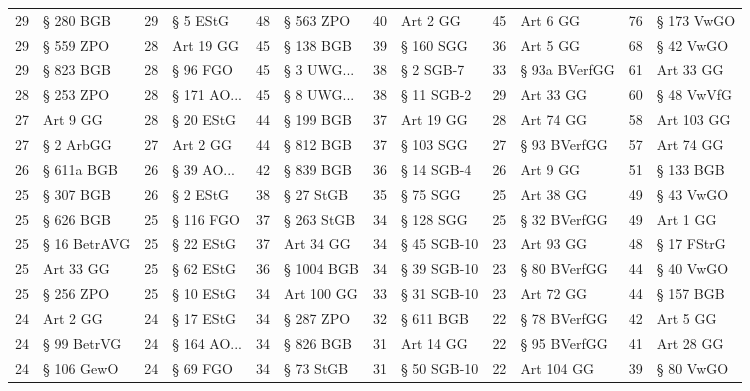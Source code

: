 \begin{tabular}{rlrlrlrlrlrl}
 29 &    § 280 BGB &  29 &       § 5 EStG &  48 &     § 563 ZPO &  40 &    Art 2 GG &     45 &        Art 6 GG &     76 & § 173 VwGO \\
 29 &    § 559 ZPO &  28 &      Art 19 GG &  45 &     § 138 BGB &  39 &   § 160 SGG &     36 &        Art 5 GG &     68 &  § 42 VwGO \\
 29 &    § 823 BGB &  28 &       § 96 FGO &  45 &  § 3 UWG... &  38 &   § 2 SGB-7 &     33 &   § 93a BVerfGG &     61 &  Art 33 GG \\
 28 &    § 253 ZPO &  28 &  § 171 AO... &  45 &  § 8 UWG... &  38 &  § 11 SGB-2 &     29 &       Art 33 GG &     60 & § 48 VwVfG \\
 27 &     Art 9 GG &  28 &      § 20 EStG &  44 &     § 199 BGB &  37 &   Art 19 GG &     28 &       Art 74 GG &     58 & Art 103 GG \\
 27 &    § 2 ArbGG &  27 &       Art 2 GG &  44 &     § 812 BGB &  37 &   § 103 SGG &     27 &    § 93 BVerfGG &     57 &  Art 74 GG \\
 26 &   § 611a BGB &  26 &   § 39 AO... &  42 &     § 839 BGB &  36 &  § 14 SGB-4 &     26 &        Art 9 GG &     51 &  § 133 BGB \\
 25 &    § 307 BGB &  26 &       § 2 EStG &  38 &     § 27 StGB &  35 &    § 75 SGG &     25 &       Art 38 GG &     49 &  § 43 VwGO \\
 25 &    § 626 BGB &  25 &      § 116 FGO &  37 &    § 263 StGB &  34 &   § 128 SGG &     25 &    § 32 BVerfGG &     49 &   Art 1 GG \\
 25 & § 16 BetrAVG &  25 &      § 22 EStG &  37 &     Art 34 GG &  34 & § 45 SGB-10 &     23 &       Art 93 GG &     48 & § 17 FStrG \\
 25 &    Art 33 GG &  25 &      § 62 EStG &  36 &    § 1004 BGB &  34 & § 39 SGB-10 &     23 &    § 80 BVerfGG &     44 &  § 40 VwGO \\
 25 &    § 256 ZPO &  25 &      § 10 EStG &  34 &    Art 100 GG &  33 & § 31 SGB-10 &     23 &       Art 72 GG &     44 &  § 157 BGB \\
 24 &     Art 2 GG &  24 &      § 17 EStG &  34 &     § 287 ZPO &  32 &   § 611 BGB &     22 &    § 78 BVerfGG &     42 &   Art 5 GG \\
 24 &  § 99 BetrVG &  24 &  § 164 AO... &  34 &     § 826 BGB &  31 &   Art 14 GG &     22 &    § 95 BVerfGG &     41 &  Art 28 GG \\
 24 &   § 106 GewO &  24 &       § 69 FGO &  34 &     § 73 StGB &  31 & § 50 SGB-10 &     22 &      Art 104 GG &     39 &  § 80 VwGO \\

\end{tabular}
